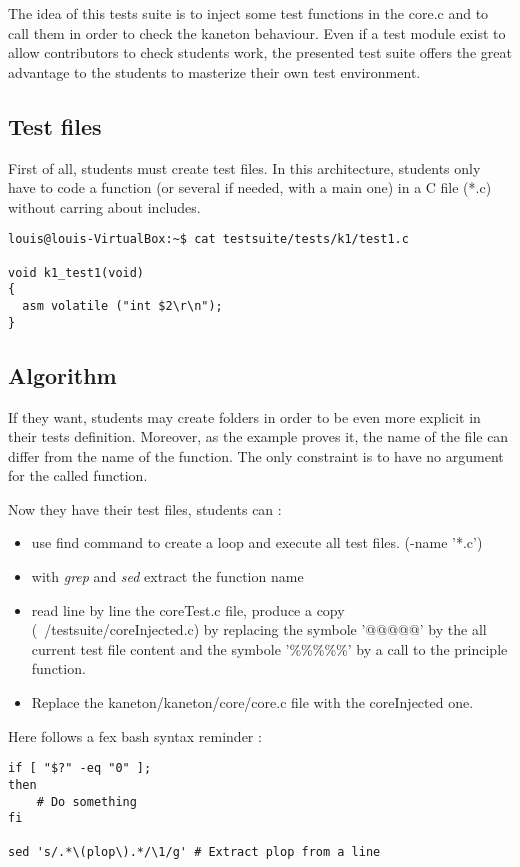 The idea of this tests suite is to inject some test functions in the core.c and to call them in order to check the kaneton behaviour. Even if a test module exist to allow contributors to check students work, the presented test suite offers the great advantage to the students to masterize their own test environment.

\subsection{Test files}
First of all, students must create test files. In this architecture, students only have to code a function (or several if needed, with a main one) in a C file (*.c) without carring about includes.

\begin{verbatim}
louis@louis-VirtualBox:~$ cat testsuite/tests/k1/test1.c

void k1_test1(void)
{
  asm volatile ("int $2\r\n");
}
\end{verbatim}

\subsection{Algorithm}
If they want, students may create folders in order to be even more explicit in their tests definition. Moreover, as the example proves it, the name of the file can differ from the name of the function. The only constraint is to have no argument for the called function.

Now they have their test files, students can :
\begin{itemize}
\item use find command to create a loop and execute all test files. (-name '*.c')
\item with \textit{grep} and \textit{sed} extract the function name
\item read line by line the coreTest.c file, produce a copy (~/testsuite/coreInjected.c) by replacing the symbole '@@@@@' by the all current test file content and the symbole '\%\%\%\%\%' by a call to the principle function.
\item Replace the kaneton/kaneton/core/core.c file with the coreInjected one.
\end{itemize}

Here follows a fex bash syntax reminder :
\begin{verbatim}
if [ "$?" -eq "0" ];
then
	# Do something
fi

sed 's/.*\(plop\).*/\1/g' # Extract plop from a line
\end{verbatim}

